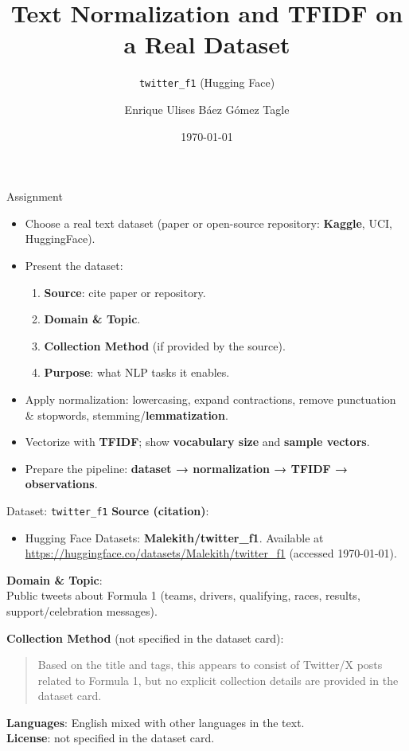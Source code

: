 \documentclass[aspectratio=169]{beamer}
\title{Text Normalization and TF\textendash IDF on a Real Dataset}
\subtitle{\texttt{twitter\_f1} (Hugging Face)}
\author{Enrique Ulises Báez Gómez Tagle}
\date{\today}
\begin{document}
\begin{frame}
  \titlepage
\end{frame}

\begin{frame}{Assignment}
\small
\begin{itemize}
  \item Choose a real text dataset (paper or open-source repository: \textbf{Kaggle}, UCI, HuggingFace).
  \item Present the dataset:
    \begin{enumerate}
      \item \textbf{Source}: cite paper or repository.
      \item \textbf{Domain \& Topic}.
      \item \textbf{Collection Method} (if provided by the source).
      \item \textbf{Purpose}: what NLP tasks it enables.
    \end{enumerate}
  \item Apply normalization: lowercasing, expand contractions, remove punctuation \& stopwords, stemming/\textbf{lemmatization}.
  \item Vectorize with \textbf{TF\textendash IDF}; show \textbf{vocabulary size} and \textbf{sample vectors}.
  \item Prepare the pipeline: \textbf{dataset → normalization → TF\textendash IDF → observations}.
\end{itemize}
\end{frame}

\begin{frame}{Dataset: \texttt{twitter\_f1}}
\small
\textbf{Source (citation)}:\\
\begin{itemize}
  \item Hugging Face Datasets: \textbf{Malekith/twitter\_f1}. Available at
  \url{https://huggingface.co/datasets/Malekith/twitter_f1} (accessed \today).
\end{itemize}

\medskip
\textbf{Domain \& Topic}:\\
Public tweets about Formula 1 (teams, drivers, qualifying, races, results, support/celebration messages).

\medskip
\textbf{Collection Method} (not specified in the dataset card):
\begin{quote}
Based on the title and tags, this appears to consist of Twitter/X posts related to Formula 1, but no explicit collection details are provided in the dataset card.
\end{quote}
\textbf{Languages}: English mixed with other languages in the text.\\
\textbf{License}: not specified in the dataset card.
\end{frame}
\end{document}
